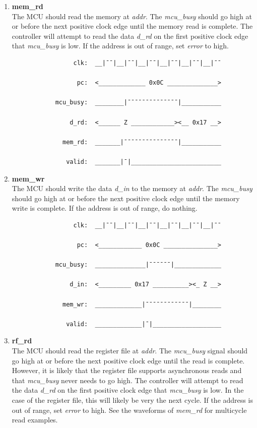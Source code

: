 \documentclass[10pt,a4paper]{article}
\begin{document}
\begin{enumerate}
    \item\textbf{mem\_rd}\\
    The MCU should read the memory at \emph{addr}. The \emph{mcu\_busy} should go
     high at or before the next positive clock edge until the memory read is complete. The
    controller will attempt to read the data \emph{d\_rd} on the first positive clock edge that
    \emph{mcu\_busy} is low. If the address is out of range, set \emph{error} to high.

        \begin{verbatim}
                 clk:  __|¯¯|__|¯¯|__|¯¯|__|¯¯|__|¯¯|__|¯¯

                  pc:  <_____________ 0x0C ______________>

            mcu_busy:  ________|¯¯¯¯¯¯¯¯¯¯¯¯¯¯|___________

                d_rd:  <______ Z ____________><__ 0x17 __>

              mem_rd:  _______|¯¯¯¯¯¯¯¯¯¯¯¯¯¯¯|___________

               valid:  _______|¯|_________________________
        \end{verbatim}

    \newpage
    \item\textbf{mem\_wr}\\
    The MCU should write the data \emph{d\_in} to the memory at \emph{addr}. The \emph{mcu\_busy} should go
    high at or before the next positive clock edge until the memory write is complete.
    If the address is out of range, do nothing.

        \begin{verbatim}
                 clk:  __|¯¯|__|¯¯|__|¯¯|__|¯¯|__|¯¯|__|¯¯

                  pc:  <____________ 0x0C _______________>

            mcu_busy:  ______________|¯¯¯¯¯¯|_____________

                d_in:  <_________ 0x17 __________><_ Z __>

              mem_wr:  _____________|¯¯¯¯¯¯¯¯¯¯¯¯|________

               valid:  _____________|¯|___________________
        \end{verbatim}

    \item\textbf{rf\_rd}\\
    The MCU should read the register file at \emph{addr}. The \emph{mcu\_busy} signal should go
    high at or before the next positive clock edge until the read is complete. However, it is
    likely that the register file supports asynchronous reads and that \emph{mcu\_busy} never
    needs to go high. The controller will attempt to read the data \emph{d\_rd} on the first positive clock edge that
    \emph{mcu\_busy} is low. In the case of the register file, this will likely be very the next
    cycle. If the address is out of range, set \emph{error} to high. See the waveforms of
    \emph{mem\_rd} for multicycle read examples.


\end{enumerate}
\end{document}
